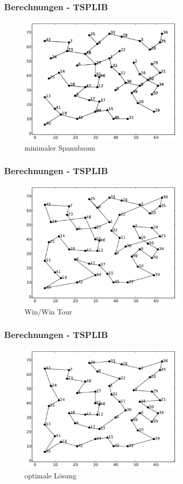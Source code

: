 \documentclass[12pt]{beamer}
\begin{document}
    \begin{frame}
        \frametitle{Berechnungen - TSPLIB}
        \begin{figure}[H]
            \centering
            \includegraphics[width=8cm]{gfx/eil51_mst}
            \caption{minimaler Spannbaum}
        \end{figure}
    \end{frame}
    \begin{frame}
        \frametitle{Berechnungen - TSPLIB}
        \begin{figure}[H]
            \centering
            \includegraphics[width=8cm]{gfx/eil51_tour}
            \caption{Win/Win Tour}
        \end{figure}
    \end{frame}
    \begin{frame}
        \frametitle{Berechnungen - TSPLIB}
        \begin{figure}[H]
            \centering
            \includegraphics[width=8cm]{gfx/eil51_opt}
            \caption{optimale Lösung}
        \end{figure}
    \end{frame}
\end{document}
